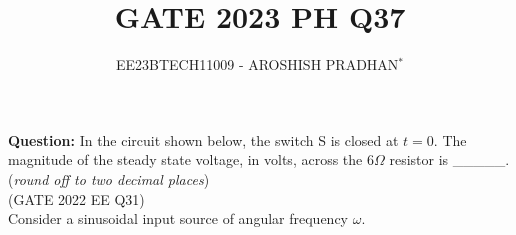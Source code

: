 \documentclass[journal,12pt,twocolumn]{IEEEtran}
\theoremstyle{remark}
\begin{document}

\vspace{3cm}

\title{GATE 2023 PH Q37}
\author{EE23BTECH11009 - AROSHISH PRADHAN$^{*}$%
}
\maketitle
\newpage
\bigskip
\textbf{Question:} In the circuit shown below, the switch S is closed at $t=0$. The magnitude of the steady state voltage, in volts, across the $6\Omega$ resistor is \_\_\_\_\_.(\textit{round off to two decimal places})\\ \hfill(GATE 2022 EE Q31)
\\

\solution 
Consider a sinusoidal input source of angular frequency $\omega$.
\end{document}
